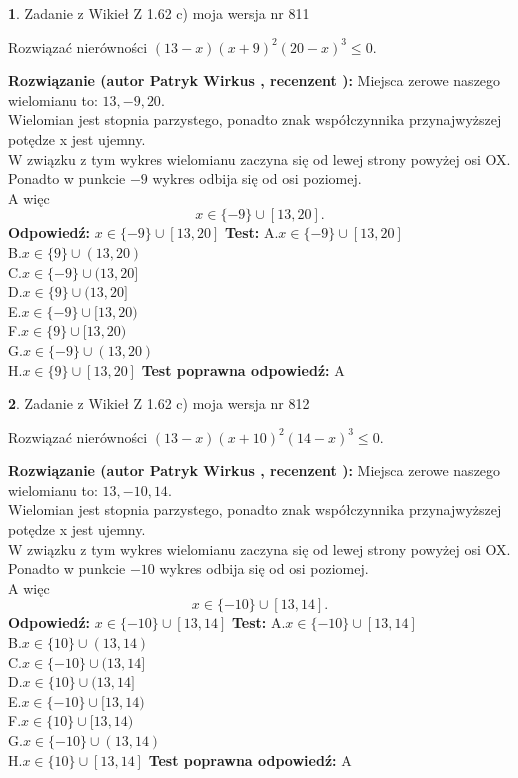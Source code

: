 \documentclass[12pt, a4paper]{article}
\theoremstyle{definition} %
\newtheorem{zad}{}
\newcommand{\zadStart}[1]{\begin{zad}#1\newline}
\newcommand{\zadStop}{\end{zad}}
\newcommand{\rozwStart}[2]{\noindent \textbf{Rozwiązanie (autor #1 , recenzent #2): }\newline}
\newcommand{\rozwStop}{\newline}
\newcommand{\odpStart}{\noindent \textbf{Odpowiedź:}\newline}
\newcommand{\odpStop}{\newline}
\newcommand{\testStart}{\noindent \textbf{Test:}\newline}
\newcommand{\testStop}{\newline}
\newcommand{\kluczStart}{\noindent \textbf{Test poprawna odpowiedź:}\newline}
\newcommand{\kluczStop}{\newline}
\begin{document}
\zadStart{Zadanie z Wikieł Z 1.62 c) moja wersja nr 811}

Rozwiązać nierówności $(13-x)(x+9)^{2}(20-x)^{3}\le0$.
\zadStop
\rozwStart{Patryk Wirkus}{}
Miejsca zerowe naszego wielomianu to: $13, -9, 20$.\\
Wielomian jest stopnia parzystego, ponadto znak współczynnika przy\linebreak najwyższej potędze x jest ujemny.\\ W związku z tym wykres wielomianu zaczyna się od lewej strony powyżej osi OX.\\
Ponadto w punkcie $-9$ wykres odbija się od osi poziomej.\\
A więc $$x \in \{-9\} \cup [13,20].$$
\rozwStop
\odpStart
$x \in \{-9\} \cup [13,20]$
\odpStop
\testStart
A.$x \in \{-9\} \cup [13,20]$\\
B.$x \in \{9\} \cup (13,20)$\\
C.$x \in \{-9\} \cup (13,20]$\\
D.$x \in \{9\} \cup (13,20]$\\
E.$x \in \{-9\} \cup [13,20)$\\
F.$x \in \{9\} \cup [13,20)$\\
G.$x \in \{-9\} \cup (13,20)$\\
H.$x \in \{9\} \cup [13,20]$
\testStop
\kluczStart
A
\kluczStop



\zadStart{Zadanie z Wikieł Z 1.62 c) moja wersja nr 812}

Rozwiązać nierówności $(13-x)(x+10)^{2}(14-x)^{3}\le0$.
\zadStop
\rozwStart{Patryk Wirkus}{}
Miejsca zerowe naszego wielomianu to: $13, -10, 14$.\\
Wielomian jest stopnia parzystego, ponadto znak współczynnika przy\linebreak najwyższej potędze x jest ujemny.\\ W związku z tym wykres wielomianu zaczyna się od lewej strony powyżej osi OX.\\
Ponadto w punkcie $-10$ wykres odbija się od osi poziomej.\\
A więc $$x \in \{-10\} \cup [13,14].$$
\rozwStop
\odpStart
$x \in \{-10\} \cup [13,14]$
\odpStop
\testStart
A.$x \in \{-10\} \cup [13,14]$\\
B.$x \in \{10\} \cup (13,14)$\\
C.$x \in \{-10\} \cup (13,14]$\\
D.$x \in \{10\} \cup (13,14]$\\
E.$x \in \{-10\} \cup [13,14)$\\
F.$x \in \{10\} \cup [13,14)$\\
G.$x \in \{-10\} \cup (13,14)$\\
H.$x \in \{10\} \cup [13,14]$
\testStop
\kluczStart
A
\kluczStop
\end{document}
